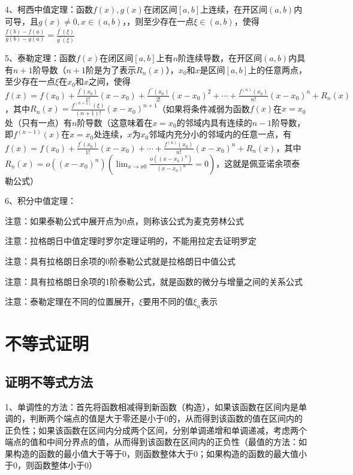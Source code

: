 4、柯西中值定理：函数$f(x),g(x)$在闭区间$[a,b]$上连续，在开区间$(a,b)$内可导，且$g(x)\ne 0,x \in(a, b)$，，则至少存在一点$\xi \in(a, b)$，使得$\frac{f(b)-f(a)}{g(b)-g(a)}=\frac{f^{\prime}(\xi)}{g^{\prime}(\xi)}$

5、泰勒定理：函数$f(x)$在闭区间$[a,b]$上有$n$阶连续导数，在开区间$(a,b)$内具有$n+1$阶导数（$n+1$阶是为了表示$R_{n}(x)$），$x_0$和$x$是区间$[a,b]$上的任意两点，至少存在一点$\xi$在$x_0$和$x$之间，使得$f(x)=f\left(x_{0}\right)+\frac{f^{\prime}\left(x_{0}\right)}{1 !}\left(x-x_{0}\right)+\frac{f^{\prime \prime}\left(x_{0}\right)}{2 !}\left(x-x_{0}\right)^{2}+\cdots+\frac{f^{(n)}\left(x_{0}\right)}{n !}\left(x-x_{0}\right)^{n}+R_{n}(x)$，其中$R_{n}(x)=\frac{f^{(n+1)}(\xi)}{(n+1) !}\left(x-x_{0}\right)^{n+1}$（如果将条件减弱为函数$f(x)$在$x=x_0$处（只有一点）有$n$阶导数（这意味着在$x=x_0$的邻域内具有连续的$n-1$阶导数，即$f^{(n-1)}(x)$在$x=x_0$处连续，$x$为$x_0$邻域内充分小的邻域内的任意一点，有$f(x)=f\left(x_{0}\right)+\frac{f^{\prime}\left(x_{0}\right)}{1 !}\left(x-x_{0}\right)+\cdots+\frac{f^{(n)}\left(x_{0}\right)}{n !}\left(x-x_{0}\right)^{n}+R_{n}(x)$，其中$R_{n}(x)=o\left(\left(x-x_{0}\right)^{n}\right)\left(\lim_ {x \rightarrow x{0}} \frac{o\left(\left(x-x_{0}\right)^{n}\right)}{\left(x-x_{0}\right)^{n}}=0\right)$，这就是佩亚诺余项泰勒公式）

6、积分中值定理：

注意：如果泰勒公式中展开点为0点，则称该公式为麦克劳林公式

注意：拉格朗日中值定理时罗尔定理证明的，不能用拉定去证明罗定

注意：具有拉格朗日余项的0阶泰勒公式就是拉格朗日中值公式

注意：具有拉格朗日余项的1阶泰勒公式，就是函数的微分与增量之间的关系公式

注意：泰勒定理在不同的位置展开，$\xi$要用不同的值$\xi_n$表示

\section{不等式证明}



\subsection{证明不等式方法}

1、单调性的方法：首先将函数相减得到新函数（构造），如果该函数在区间内是单调的，判断两个端点的值是大于零还是小于0的，从而得到该函数的值在区间内的正负性；如果该函数在区间内分成两个区间，分别单调递增和单调递减，考虑两个端点的值和中间分界点的值，从而得到该函数在区间内的正负性（最值的方法：如果构造的函数的最小值大于等于0，则函数整体大于0；如果构造的函数的最大值小于0，则函数整体小于0）

